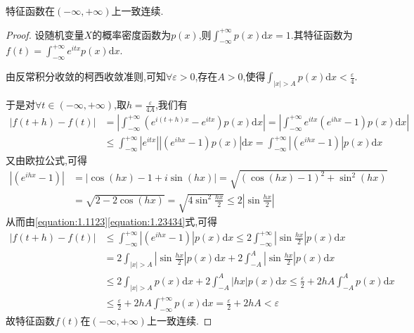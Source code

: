 \documentclass[lang=cn,newtx,10pt,scheme=chinese]{../../Template/elegantbook}
\begin{document}
\begin{theorem}[特征函数性质]\label{theorem:特征函数性质}
    特征函数在$(-\infty,+\infty)$上一致连续.
\end{theorem}
\begin{proof}
设随机变量\(X\)的概率密度函数为\(p(x)\),则\(\int_{-\infty}^{+\infty}p(x)\mathrm{d}x = 1\).其特征函数为\(f(t) = \int_{-\infty}^{+\infty}e^{itx}p(x)\mathrm{d}x\).

由反常积分收敛的柯西收敛准则,可知\(\forall \varepsilon > 0\),存在\(A > 0\),使得\(\int_{|x| > A}p(x)\mathrm{d}x < \frac{\varepsilon}{4}\).

于是对\(\forall t \in (-\infty, +\infty)\),取\(h = \frac{\varepsilon}{4A}\),我们有
\begin{equation}\label{equation:1.1123}
\begin{aligned}
|f(t + h) - f(t)| &= \left|\int_{-\infty}^{+\infty}(e^{i(t + h)x} - e^{itx})p(x)\mathrm{d}x\right|
= \left|\int_{-\infty}^{+\infty}e^{itx}(e^{ihx} - 1)p(x)\mathrm{d}x\right|\\
&\leqslant \int_{-\infty}^{+\infty}|e^{itx}||(e^{ihx} - 1)p(x)|\mathrm{d}x
= \int_{-\infty}^{+\infty}|(e^{ihx} - 1)|p(x)\mathrm{d}x
\end{aligned}
\end{equation}
又由欧拉公式,可得
\begin{equation}\label{equation:1.23434}
    \begin{aligned}
|(e^{ihx} - 1)| &= |\cos(hx) - 1 + i\sin(hx)|
= \sqrt{(\cos(hx) - 1)^2 + \sin^2(hx)}\\
&= \sqrt{2 - 2\cos(hx)}
= \sqrt{4\sin^2\frac{hx}{2}} \leqslant 2\left|\sin\frac{hx}{2}\right|
\end{aligned}
\end{equation}
从而由\eqref{equation:1.1123}\eqref{equation:1.23434}式,可得
\begin{align*}
|f(t + h) - f(t)| &\leqslant \int_{-\infty}^{+\infty}|(e^{ihx} - 1)|p(x)\mathrm{d}x
\leqslant 2\int_{-\infty}^{+\infty}\left|\sin\frac{hx}{2}\right|p(x)\mathrm{d}x\\
&= 2\int_{|x| > A}\left|\sin\frac{hx}{2}\right|p(x)\mathrm{d}x + 2\int_{-A}^{A}\left|\sin\frac{hx}{2}\right|p(x)\mathrm{d}x\\
&\leqslant 2\int_{|x| > A}p(x)\mathrm{d}x + 2\int_{-A}^{A}|hx|p(x)\mathrm{d}x
\leqslant \frac{\varepsilon}{2} + 2hA\int_{-A}^{A}p(x)\mathrm{d}x\\
&\leqslant \frac{\varepsilon}{2} + 2hA\int_{-\infty}^{+\infty}p(x)\mathrm{d}x
= \frac{\varepsilon}{2} + 2hA < \varepsilon
\end{align*}
故特征函数\(f(t)\)在\((-\infty, +\infty)\)上一致连续. 

\end{proof}
\end{document}
